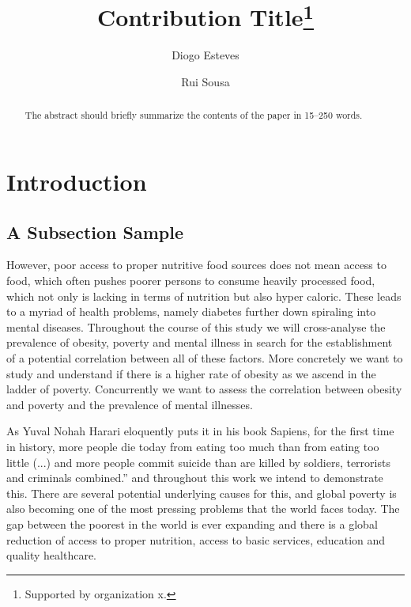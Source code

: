 \documentclass[runningheads]{llncs}
\begin{document}
%
\title{Contribution Title\thanks{Supported by organization x.}}
%
%
\author{Diogo Esteves\and
Rui Sousa}
%
%
%
\maketitle              %
%
\begin{abstract}
The abstract should briefly summarize the contents of the paper in
15--250 words.

\end{abstract}
%
%
%
\section{Introduction}
\subsection{A Subsection Sample}

However, poor access to proper nutritive food sources does not mean access to food, which often pushes poorer persons to consume heavily processed food, which not only is lacking in terms of nutrition but also hyper caloric. These leads to a myriad of health problems, namely diabetes further down spiraling into mental diseases. Throughout the course of this study we will cross-analyse the prevalence of obesity, poverty and mental illness in search for the establishment of a potential correlation between all of these factors. More concretely we want to study and understand if there is a higher rate of obesity as we ascend in the ladder of poverty. Concurrently we want to assess the correlation between obesity and poverty and the prevalence of mental illnesses.

As Yuval Nohah Harari eloquently puts it in his book Sapiens, for the first time in history, more people die today from eating too much than from eating too little (...) and more people commit suicide than are killed by soldiers, terrorists and criminals combined.” and throughout this work we intend to demonstrate this. There are several potential underlying causes for this, and global poverty is also becoming one of the most pressing problems that the world faces today. The gap between the poorest in the world is ever expanding and there is a global reduction of access to proper nutrition, access to basic services, education and quality healthcare.
\end{document}
